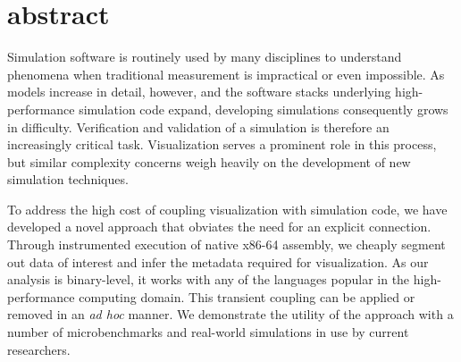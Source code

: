 \newcommand{\addr}[1]{\texttt{#1}}

\section{abstract}


%

Simulation software is routinely used by many disciplines to understand
phenomena when traditional measurement is impractical or even
impossible.  As models increase in detail, however, and the software
stacks underlying high-performance simulation code expand, developing
simulations consequently grows in difficulty.  Verification and
validation of a simulation is therefore an increasingly critical task.
Visualization serves a prominent role in this process, but similar
complexity concerns weigh heavily on the development of new simulation
techniques.

To address the high cost of coupling visualization with simulation
code, we have developed a novel approach that obviates the need for
an explicit connection.  Through instrumented execution of native
x86-64 assembly, we cheaply segment out data of interest and infer the
metadata required for visualization.  As our analysis is binary-level,
it works with any of the languages popular in the high-performance
computing domain.  This transient coupling can be applied or removed
in an \textit{ad hoc} manner.  We demonstrate the utility of the
approach with a number of microbenchmarks and real-world simulations
in use by current researchers.

